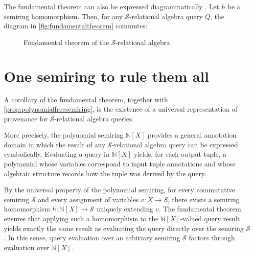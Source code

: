 \documentclass[oneside, 11pt]{amsbook}
\theoremstyle{plain}
\theoremstyle{definition}
\theoremstyle{remark}
\begin{document}
The fundamental theorem can also be expressed diagrammatically \cite{Green2017}. Let $h$ be a semiring homomorphism. Then, for any $\mathcal{S}$-relational algebra query $Q$, the diagram in \autoref{fig:fundamentaltheorem} commutes:

\begin{figure}[htbp]
    \centering
    \caption{Fundamental theorem of the $\mathcal{S}$-relational algebra}
    \label{fig:fundamentaltheorem}
\end{figure}

\section{One semiring to rule them all}

A corollary of the fundamental theorem, together with \autoref{prop:polynomialfreesemiring}, is the existence of a universal
representation of provenance for $\mathcal{S}$-relational algebra queries.

More precisely, the polynomial semiring $\mathbb{N}[X]$ provides a general annotation domain in which the result of any $\mathcal{S}$-relational algebra query can be expressed symbolically. Evaluating a query in $\mathbb{N}[X]$ yields, for each output tuple, a polynomial whose variables correspond to input tuple annotations and whose algebraic structure records how the tuple was derived by the query.

By the universal property of the polynomial semiring, for every commutative semiring $\mathcal{S}$ and every assignment of variables $v : X \to S$, there exists a semiring homomorphism $h : \mathbb{N}[X] \to \mathcal{S}$ uniquely extending $v$. The fundamental theorem ensures that applying such a homomorphism to the $\mathbb{N}[X]$-valued query result yields exactly the same result as evaluating the query directly over the semiring $\mathcal{S}$. In this sense, query evaluation over an arbitrary semiring $\mathcal{S}$ factors through evaluation over $\mathbb{N}[X]$.
\end{document}

